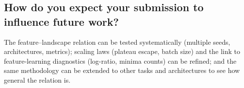 \documentclass{article}
\begin{document}
\subsection{How do you expect your submission to influence future work?}
The feature--landscape relation can be tested systematically (multiple seeds, architectures, metrics); scaling laws (plateau escape, batch size) and the link to feature-learning diagnostics (log-ratio, minima counts) can be refined; and the same methodology can be extended to other tasks and architectures to see how general the relation is.
\end{document}
